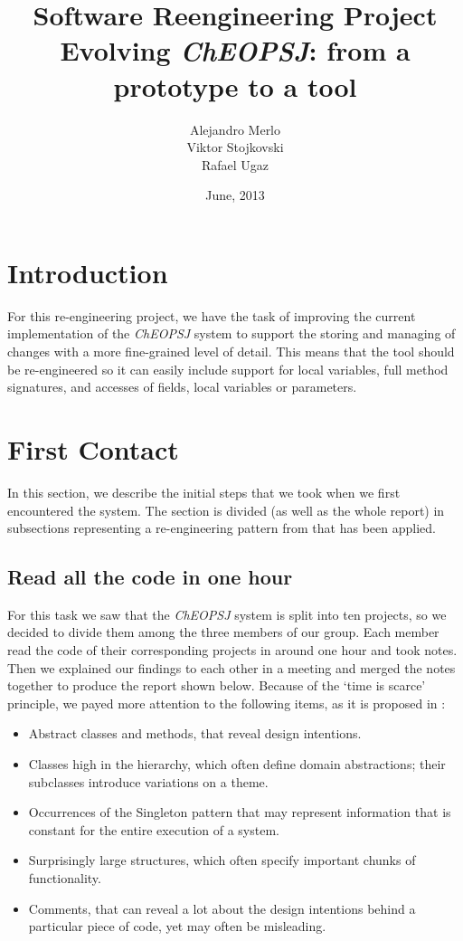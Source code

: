 \documentclass[a4paper]{article}
\title{Software Reengineering Project \\ Evolving \emph{ChEOPSJ}: from a prototype to a tool}
\author{Alejandro Merlo\\ Viktor Stojkovski\\ Rafael Ugaz}
\date{June, 2013}
\begin{document}
\maketitle

\section{Introduction}
For this re-engineering project, we have the task of improving the current implementation of the \emph{ChEOPSJ} system to support the storing and managing of changes with a more fine-grained level of detail. This means that the tool should be re-engineered so it can easily include support for local variables, full method signatures, and accesses of fields, local variables or parameters.

\section{First Contact}
In this section, we describe the initial steps that we took when we first encountered the system. The section is divided (as well as the whole report) in subsections representing a re-engineering pattern from \cite{demeyer02} that has been applied.

\subsection{Read all the code in one hour}
\label{sec:codeOneHour}
For this task we saw that the \emph{ChEOPSJ} system is split into ten projects, so we decided to divide them among the three members of our group. Each member read the code of their corresponding projects in around one hour and took notes. Then we explained our findings to each other in a meeting and merged the notes together to produce the report shown below. Because of the `time is scarce' principle, we payed more attention to the following items, as it is proposed in \cite{demeyer02}:
\begin{itemize}
\item Abstract classes and methods, that reveal design intentions.
\item Classes high in the hierarchy, which often define domain abstractions; their subclasses introduce variations on a theme.
\item Occurrences of the Singleton pattern that may represent information that is constant for the entire execution of a system.
\item Surprisingly large structures, which often specify important chunks of functionality.
\item Comments, that can reveal a lot about the design intentions behind a particular piece of code, yet may often be misleading.
\end{itemize}
\end{document}
